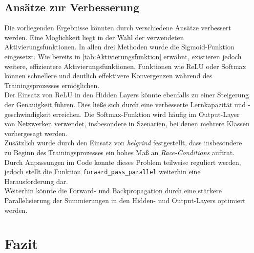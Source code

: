 \documentclass[a4paper, 12pt]{article}
\begin{document}
\subsection{Ansätze zur Verbesserung}\label{chapter..5.3}

Die vorliegenden Ergebnisse könnten durch verschiedene Ansätze verbessert werden. Eine 
Möglichkeit liegt in der Wahl der verwendeten Aktivierungsfunktionen. In allen drei 
Methoden wurde die Sigmoid-Funktion eingesetzt. Wie bereits in \autoref{tab:Aktivierungsfunktion} 
erwähnt, existieren jedoch weitere, effizientere Aktivierungsfunktionen. Funktionen wie 
ReLU oder Softmax können schnellere und deutlich effektivere Konvergenzen während des 
Trainingsprozesses ermöglichen.\\
Der Einsatz von ReLU in den Hidden Layers könnte ebenfalls zu einer Steigerung der 
Genauigkeit führen. Dies ließe sich durch eine verbesserte Lernkapazität und 
-geschwindigkeit erreichen. Die Softmax-Funktion wird häufig im Output-Layer von 
Netzwerken verwendet, insbesondere in Szenarien, bei denen mehrere Klassen vorhergesagt 
werden.\\
Zusätzlich wurde durch den Einsatz von \textit{helgrind} festgestellt, dass insbesondere zu 
Beginn des Trainingsprozesses ein hohes Maß an \textit{Race-Conditions} auftrat. Durch 
Anpassungen im Code konnte dieses Problem teilweise reguliert werden, jedoch stellt die 
Funktion \texttt{forward\_pass\_parallel} weiterhin eine Herausforderung dar.\\
Weiterhin könnte die Forward- und Backpropagation durch eine stärkere Parallelisierung 
der Summierungen in den Hidden- und Output-Layers optimiert werden.

\newpage %

\section{Fazit}
\end{document}
